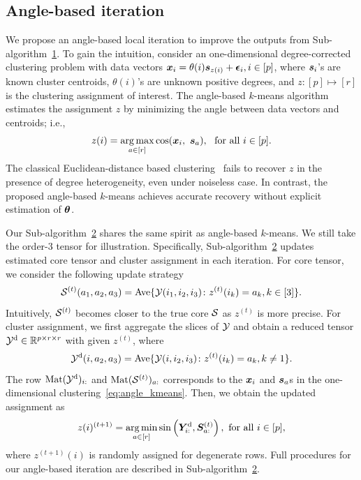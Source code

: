 \documentclass[lettersize,onecolumn,journal]{IEEEtran}
\theoremstyle{definition}
\theoremstyle{definition}
\newcommand{\of}[1]{\left(#1\right)}
\begin{document}
\subsection{Angle-based iteration}
We propose an angle-based local iteration to improve the outputs from Sub-algorithm~\hyperref[alg:main]{1}. To gain the intuition, consider an one-dimensional degree-corrected clustering problem with data vectors $\bm x_i = \theta(i) \bm{s}_{z(i)} + \boldsymbol{\epsilon}_i, i \in [p]$, where $\bm{s}_i$'s are known cluster centroids, $\theta(i)$'s are unknown positive degrees, and $z\colon [p] \mapsto [r]$ is the clustering assignment of interest. The angle-based $k$-means algorithm estimates the assignment $z$ by minimizing the angle between data vectors and centroids; i.e., 
 \begin{equation}\label{eq:angle_kmeans}
     z(i) = \argmax_{a \in [r]} \cos ( \mx_i,\ \ms_{a} ),\ \text{ for all }i \in [p].
 \end{equation}
The classical Euclidean-distance based clustering~\citep{han2020exact} fails to recover $z$ in the presence of degree heterogeneity, even under noiseless case. In contrast, the proposed angle-based $k$-means achieves accurate recovery without explicit estimation of $\boldsymbol{\theta}$. 

Our Sub-algorithm~\hyperref[alg:main]{2} shares the same spirit as angle-based $k$-means. {\color{blue} We still take the order-3 tensor for illustration.} 
{
\color{blue}
Specifically, Sub-algorithm~\hyperref[alg:main]{2} updates estimated core tensor and cluster assignment in each iteration. For core tensor, we consider the following update strategy  
 \[
 \mathcal{S}^{(t)}(a_1,a_2,a_3)=\text{Ave}\{\mathcal{Y}(i_1,i_2,i_3)\colon z^{(t)}(i_k)=a_k, k\in[3]\}.
\]
Intuitively, $\mathcal{S}^{(t)}$ becomes closer to the true core $\mathcal{S}$ as $z^{(t)}$ is more precise. For cluster assignment, we first aggregate the slices of $\mathcal{Y}$ and obtain a reduced tensor $\mathcal{Y}^{\text{d}}\in \mathbb{R}^{p \times r \times r}$ with given $z^{(t)}$, where
\[
\mathcal{Y}^{\text{d}}(i,a_2,a_3)=\text{Ave}\{\mathcal{Y}(i,i_2,i_3)\colon z^{(t)}(i_k)=a_k, k \neq 1\}.
\]
The row $\text{Mat}(\mathcal{Y}^{\text{d}})_{i:}$ and $\text{Mat}(\mathcal{S}^{(t)})_{a:}$ corresponds to the $\bm x_i$ and $\bm{s}_a$s in the one-dimensional clustering~\eqref{eq:angle_kmeans}. Then, we obtain the updated assignment as
\[z(i)^{(t+1)} = \argmin_{a \in [r]} \sin \of{ \mY^{\text{d}}_{i:}, \mS^{(t)}_{a:} }, \text{ for all } i \in [p], \]
where $z^{(t+1)}(i)$ is randomly assigned for degenerate rows. 
}
Full procedures for our angle-based iteration are described in Sub-algorithm~\hyperref[alg:main]{2}. 
\end{document}
